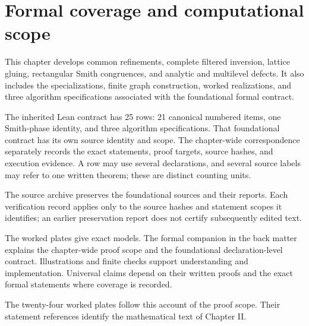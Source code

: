 \section{Formal coverage and computational scope}\label{sec:edition-scope}
This chapter develops common refinements, complete filtered inversion, lattice gluing, rectangular Smith congruences, and analytic and multilevel defects. It also includes the specializations, finite graph construction, worked realizations, and three algorithm specifications associated with the foundational formal contract.



The inherited Lean contract has 25 rows: 21 canonical numbered items, one Smith-phase identity, and three algorithm specifications. That foundational contract has its own source identity and scope. The chapter-wide correspondence separately records the exact statements, proof targets, source hashes, and execution evidence. A row may use several declarations, and several source labels may refer to one written theorem; these are distinct counting units.

The source archive preserves the foundational sources and their reports. Each verification record applies only to the source hashes and statement scopes it identifies; an earlier preservation report does not certify subsequently edited text.

The worked plates give exact models. The formal companion in the back matter explains the chapter-wide proof scope and the foundational declaration-level contract. Illustrations and finite checks support understanding and implementation. Universal claims depend on their written proofs and the exact formal statements where coverage is recorded.

The twenty-four worked plates follow this account of the proof scope. Their statement references identify the mathematical text of Chapter II.
